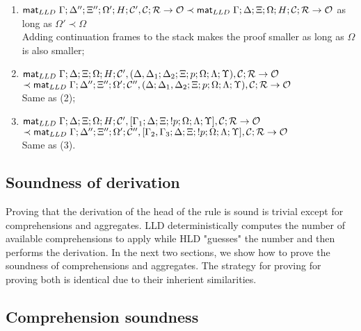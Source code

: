 \begin{enumerate}[leftmargin=*]
   \item $\mathsf{mat}_{LLD} \; \Gamma; \Delta''; \Xi''; \Omega'; H; \mathcal{C'}, \mathcal{C};
         \mathcal{R} \rightarrow \mathcal{O} \prec \mathsf{mat}_{LLD} \; \Gamma; \Delta; \Xi; \Omega;
         H; \mathcal{C}; \mathcal{R} \rightarrow \mathcal{O}$ as long
   as $\Omega' \prec \Omega$\\ Adding continuation frames to the stack makes the
   proof smaller as long as $\Omega$ is also smaller; 

   \item $\mathsf{mat}_{LLD} \; \Gamma; \Delta; \Xi; \Omega; H; \mathcal{C'}, (\Delta, \Delta_1;
         \Delta_2; \Xi; p; \Omega; \Lambda; \Upsilon), \mathcal{C}; \mathcal{R}
   \rightarrow \mathcal{O}$\\ \hspace*{1cm} $\prec \mathsf{mat}_{LLD} \; \Gamma; \Delta''; \Xi'';
   \Omega'; \mathcal{C''}, (\Delta; \Delta_1, \Delta_2; \Xi; p; \Omega; \Lambda;
         \Upsilon), \mathcal{C}; \mathcal{R} \rightarrow \mathcal{O}$\\ Same as (2);

   \item $\mathsf{mat}_{LLD} \; \Gamma; \Delta; \Xi; \Omega; H; \mathcal{C'}, [\Gamma_1; \Delta;
   \Xi; {!} p; \Omega; \Lambda; \Upsilon], \mathcal{C}; \mathcal{R} \rightarrow \mathcal{O}$\\
   \hspace*{1cm} $\prec \mathsf{mat}_{LLD} \; \Gamma; \Delta''; \Xi''; \Omega'; \mathcal{C''},
   [\Gamma_2, \Gamma_3; \Delta; \Xi; {!} p; \Omega; \Lambda; \Upsilon],
   \mathcal{C}; \mathcal{R} \rightarrow \mathcal{O}$\\
   Same as (3).

\end{enumerate}

\subsection{Soundness of derivation}

Proving that the derivation of the head of the rule is sound is trivial except
for comprehensions and aggregates. LLD deterministically computes the number of
available comprehensions to apply while HLD "guesses" the number and then
performs the derivation. In the next two sections, we show how to prove the
soundness of comprehensions and aggregates. The strategy for proving for proving
both is identical due to their inherient similarities.

\subsection{Comprehension soundness}

